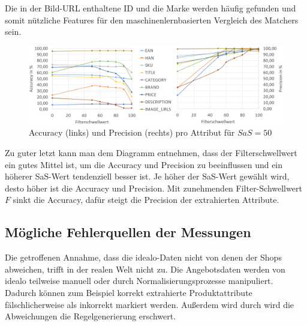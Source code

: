 Die in der Bild-URL enthaltene ID und die Marke werden häufig gefunden und somit nützliche Features
für den maschinenlernbasierten Vergleich des Matchers sein.

\begin{figure}[H]
    \centering
    \includegraphics[width=\textwidth]{resources/accuracy-and-precision-per-attribute.PNG}
    \caption{Accuracy (links) und Precision (rechts) pro Attribut für $SaS=50$}
    \label{abb:testdaten}
    \vspace{-0.5cm}
\end{figure}

Zu guter letzt kann man dem Diagramm entnehmen, dass der Filterschwellwert ein gutes Mittel ist, um die Accuracy und
Precision zu beeinflussen und ein höherer SaS-Wert tendenziell besser ist.
Je höher der SaS-Wert gewählt wird, desto höher ist die Accuracy und Precision.
Mit zunehmenden Filter-Schwellwert $F$ sinkt die Accuracy, dafür steigt die Precision der extrahierten Attribute.

\subsection{Mögliche Fehlerquellen der Messungen}
\label{subsec:fehlerquellen}

Die getroffenen Annahme, dass die idealo-Daten nicht von denen der Shops abweichen, trifft in der realen Welt nicht zu.
Die Angebotsdaten werden von idealo teilweise manuell oder durch Normalisierungsprozesse manipuliert.
Dadurch können zum Beispiel korrekt extrahierte Produktattribute fälschlicherweise als inkorrekt markiert werden.
Außerdem wird durch wird die Abweichungen die Regelgenerierung erschwert.